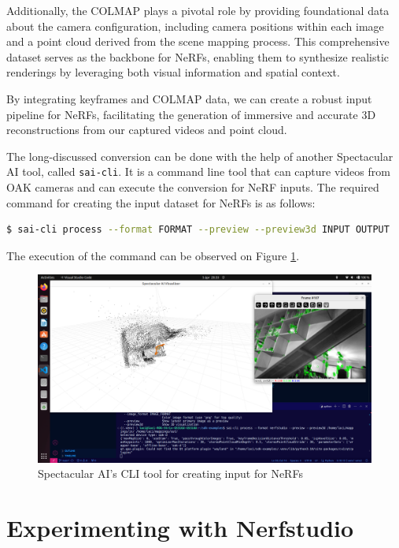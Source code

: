 Additionally, the COLMAP plays a pivotal role by providing foundational data about the camera configuration, including camera positions within each image and a point cloud derived from the scene mapping process. This comprehensive dataset serves as the backbone for NeRFs, enabling them to synthesize realistic renderings by leveraging both visual information and spatial context.

By integrating keyframes and COLMAP data, we can create a robust input pipeline for NeRFs, facilitating the generation of immersive and accurate 3D reconstructions from our captured videos and point cloud.

The long-discussed conversion can be done with the help of another Spectacular AI tool, called \verb|sai-cli|. It is a command line tool that can capture videos from OAK cameras and can execute the conversion for NeRF inputs. The required command for creating the input dataset for NeRFs is as follows:

\FloatBarrier
\begin{lstlisting}[language=bash,frame=single,float=!ht]
$ sai-cli process --format FORMAT --preview --preview3d INPUT OUTPUT
\end{lstlisting}

The execution of the command can be observed on Figure \ref{fig:sai_cli_process}. 

\begin{figure}[htbp]
	\centering
	\includegraphics[width=150mm, keepaspectratio]{figures/sai-cli_process.png}
	\caption{Spectacular AI's CLI tool for creating input for NeRFs}
	\label{fig:sai_cli_process}
\end{figure}

\section{Experimenting with Nerfstudio}

